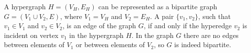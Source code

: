 \exercise
A hypergraph $H=(V_H,E_H)$ can be represented as a bipartite graph $G=(V_1\cup V_2,E)$, where $V_1=V_H$ and $V_2=E_H$.
A pair $\{v_1,v_2\}$, such that $v_1\in V_1$ and $v_2\in V_2$, is an edge of the graph $G$, if and only if the hyperedge $v_2$ is incident on vertex $v_1$ in the hypergraph $H$.
In the graph $G$ there are no edges between elements of $V_1$ or between elements of $V_2$, so $G$ is indeed bipartite.
